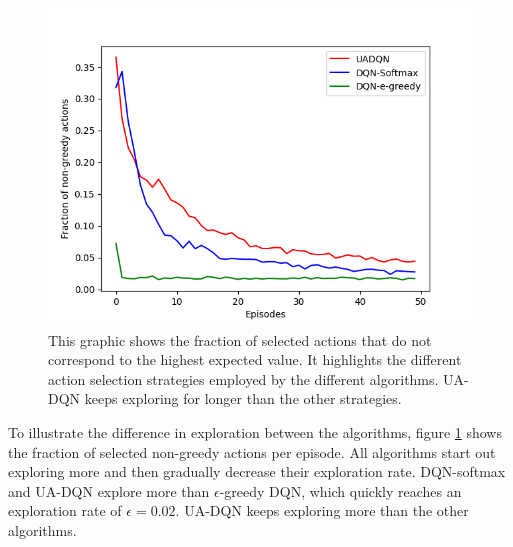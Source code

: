 \begin{figure}
  \centering
  \includegraphics[width=\figurewidth]{figures/non-greedy-fraction.png}
  \caption{This graphic shows the fraction of selected actions that do not correspond to the highest expected value. It highlights the different action selection strategies employed by the different algorithms. UA-DQN keeps exploring for longer than the other strategies.}
  \label{fig:non_greedy_fraction}
\end{figure}

To illustrate the difference in exploration between the algorithms, figure \ref{fig:non_greedy_fraction} shows the fraction of selected non-greedy actions per episode.
All algorithms start out exploring more and then gradually decrease their exploration rate.
DQN-softmax and UA-DQN explore more than $\epsilon$-greedy DQN, which quickly reaches an exploration rate of $\epsilon = 0.02$.
UA-DQN keeps exploring more than the other algorithms.

\clearpage
